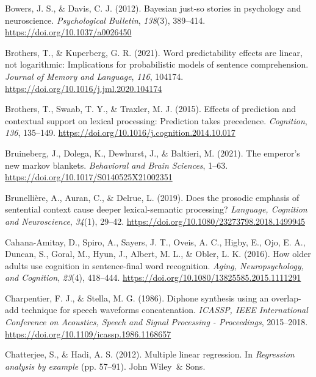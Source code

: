 \documentclass[a4paper, nobind]{templates/ociamthesis}
\newlength{\cslhangindent}
\newenvironment{CSLReferences}[2] %
 {%
  \setlength{\parindent}{0pt}
  \ifodd #1
  \let\oldpar\par
  \def\par{\hangindent=\cslhangindent\oldpar}
  \fi
  \setlength{\parskip}{1mm}
  \setlength{\baselineskip}{6mm}
 }%
 {}
\begin{document}
\begin{CSLReferences}{1}{0}
\leavevmode{}%
Bowers, J. S., \& Davis, C. J. (2012). {Bayesian just-so stories in psychology and neuroscience}. \emph{Psychological Bulletin}, \emph{138}(3), 389--414. \url{https://doi.org/10.1037/a0026450}

\leavevmode{}%
Brothers, T., \& Kuperberg, G. R. (2021). {Word predictability effects are linear, not logarithmic: Implications for probabilistic models of sentence comprehension}. \emph{Journal of Memory and Language}, \emph{116}, 104174. \url{https://doi.org/10.1016/j.jml.2020.104174}

\leavevmode{}%
Brothers, T., Swaab, T. Y., \& Traxler, M. J. (2015). {Effects of prediction and contextual support on lexical processing: Prediction takes precedence}. \emph{Cognition}, \emph{136}, 135--149. \url{https://doi.org/10.1016/j.cognition.2014.10.017}

\leavevmode{}%
Bruineberg, J., Dolega, K., Dewhurst, J., \& Baltieri, M. (2021). The emperor's new markov blankets. \emph{Behavioral and Brain Sciences}, 1--63. \url{https://doi.org/10.1017/S0140525X21002351}

\leavevmode{}%
Brunellière, A., Auran, C., \& Delrue, L. (2019). {Does the prosodic emphasis of sentential context cause deeper lexical-semantic processing?} \emph{Language, Cognition and Neuroscience}, \emph{34}(1), 29--42. \url{https://doi.org/10.1080/23273798.2018.1499945}

\leavevmode{}%
Cahana-Amitay, D., Spiro, A., Sayers, J. T., Oveis, A. C., Higby, E., Ojo, E. A., Duncan, S., Goral, M., Hyun, J., Albert, M. L., \& Obler, L. K. (2016). {How older adults use cognition in sentence-final word recognition}. \emph{Aging, Neuropsychology, and Cognition}, \emph{23}(4), 418--444. \url{https://doi.org/10.1080/13825585.2015.1111291}

\leavevmode{}%
Charpentier, F. J., \& Stella, M. G. (1986). {Diphone synthesis using an overlap-add technique for speech waveforms concatenation.} \emph{ICASSP, IEEE International Conference on Acoustics, Speech and Signal Processing - Proceedings}, 2015--2018. \url{https://doi.org/10.1109/icassp.1986.1168657}

\leavevmode{}%
Chatterjee, S., \& Hadi, A. S. (2012). Multiple linear regression. In \emph{Regression analysis by example} (pp. 57--91). John Wiley~\& Sons.


\end{CSLReferences}
\end{document}
